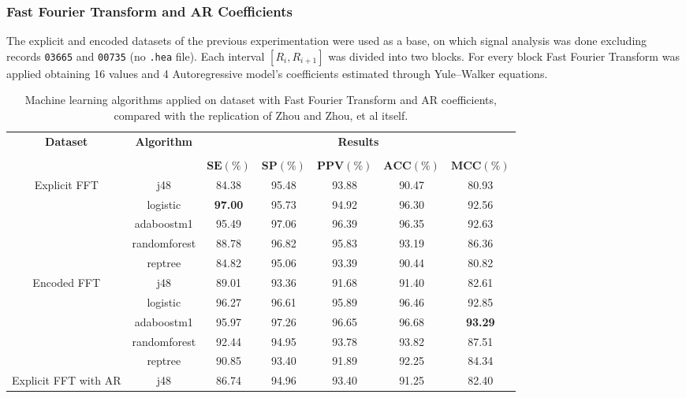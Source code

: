 \subsubsection{Fast Fourier Transform and AR Coefficients}
The explicit and encoded datasets of the previous experimentation were used as a base, on which signal analysis was done excluding records \verb|03665| and \verb|00735| (no \verb|.hea| file). Each interval $[R_i, R_{i+1}]$ was divided into two blocks. For every block Fast Fourier Transform was applied obtaining 16 values and 4 Autoregressive model's coefficients estimated through Yule–Walker equations. 

\begin{table}[h]
\begin{center}
\begin{threeparttable}
\caption[State of the art algorithm replication performance.]{Machine learning algorithms applied on dataset with Fast Fourier Transform and AR coefficients, compared with the replication of Zhou and Zhou, et al \cite{zhou2015} itself.}
\label{table:zhou_unimol_fft_ar}
\scriptsize
  \begin{tabular}{c c c c c c c}
  \toprule
  \textbf{Dataset} & \textbf{Algorithm} & \multicolumn{5}{c}{\textbf{Results}} \\
  \cline{3-7}
  \\
  & & $\mathbf{SE(\%)}$ & $\mathbf{SP(\%)}$ & $\mathbf{PPV(\%)}$ & $\mathbf{ACC(\%)}$ & $\mathbf{MCC(\%)}$\\
  \midrule  
  Explicit FFT & j48 & 84.38 & 95.48 & 93.88 & 90.47 & 80.93 \\ 
  & logistic & \textbf{97.00} & 95.73 & 94.92 & 96.30 & 92.56 \\
  & adaboostm1 & 95.49 & 97.06 & 96.39 & 96.35 & 92.63 \\
  & randomforest & 88.78 & 96.82 & 95.83 & 93.19 & 86.36 \\
  & reptree &  84.82 & 95.06 & 93.39 & 90.44 & 80.82 \\
  \hline
  Encoded FFT & j48 & 89.01 & 93.36 & 91.68 & 91.40 & 82.61 \\
  & logistic & 96.27 & 96.61 & 95.89 & 96.46 & 92.85 \\
  & adaboostm1 & 95.97 & 97.26 & 96.65 & 96.68 & \textbf{93.29} \\
  & randomforest & 92.44 & 94.95 & 93.78 & 93.82 & 87.51 \\
  & reptree  & 90.85 & 93.40 & 91.89 & 92.25 & 84.34 \\
  \hline
  Explicit FFT with AR & j48 & 86.74 & 94.96 & 93.40 & 91.25 & 82.40 \\

\end{tabular}
\end{threeparttable}
\end{center}
\end{table}
